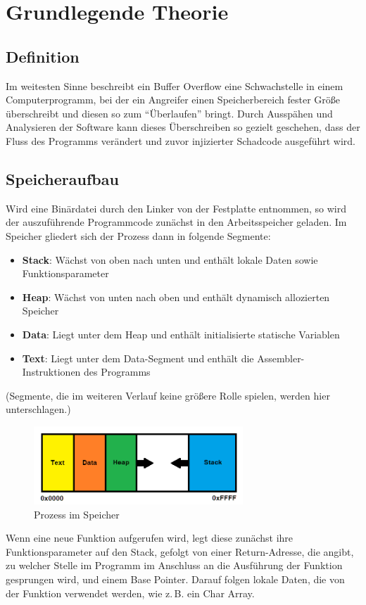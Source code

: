 \section{Grundlegende Theorie}
\subsection{Definition}
Im weitesten Sinne beschreibt ein Buffer Overflow eine Schwachstelle in einem Computerprogramm,
bei der ein Angreifer einen Speicherbereich fester Größe überschreibt und diesen so zum “Überlaufen” bringt.
Durch Ausspähen und Analysieren der Software kann dieses Überschreiben so gezielt geschehen, dass der Fluss des
Programms verändert und zuvor injizierter Schadcode ausgeführt wird.
\subsection{Speicheraufbau}
Wird eine Binärdatei durch den Linker von der Festplatte entnommen, so wird der auszuführende Programmcode
zunächst in den Arbeitsspeicher geladen. Im Speicher gliedert sich der Prozess dann in folgende Segmente:
\begin{itemize}
    \item \textbf{Stack}: Wächst von oben nach unten und enthält lokale Daten sowie Funktionsparameter
    \item \textbf{Heap}: Wächst von unten nach oben und enthält dynamisch allozierten Speicher
    \item \textbf{Data}: Liegt unter dem Heap und enthält initialisierte statische Variablen
    \item \textbf{Text}: Liegt unter dem Data-Segment und enthält die Assembler-Instruktionen des Programms
\end{itemize}

(Segmente, die im weiteren Verlauf keine größere Rolle spielen, werden hier unterschlagen.)
\begin{figure}[h]
    \centering
    \includegraphics[width=0.7\textwidth,height=0.75\textheight,keepaspectratio]{images/process.png}
    \caption{Prozess im Speicher}
\end{figure}
Wenn eine neue Funktion aufgerufen wird, legt diese zunächst ihre Funktionsparameter auf den Stack,
gefolgt von einer Return-Adresse, die angibt, zu welcher Stelle im Programm im Anschluss an die
Ausführung der Funktion gesprungen wird, und einem Base Pointer. Darauf folgen lokale Daten,
die von der Funktion verwendet werden, wie z.\,B. ein Char Array.
\pagebreak
